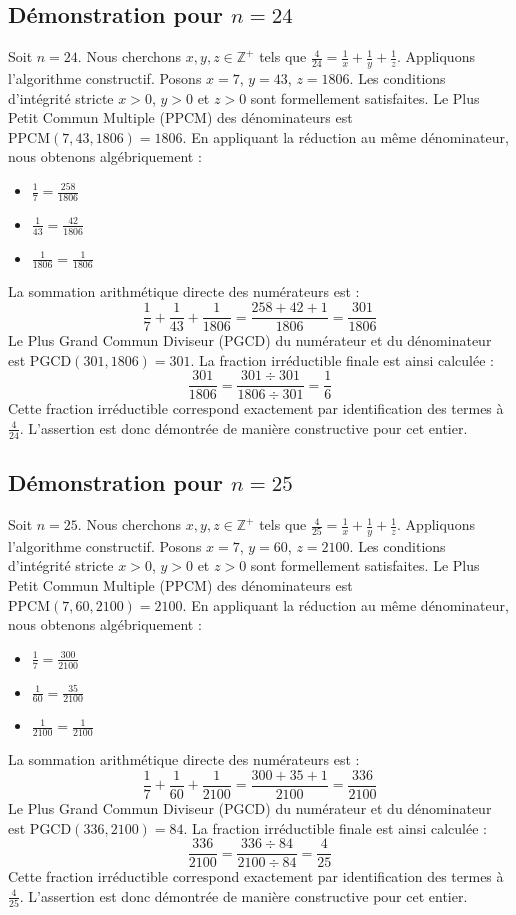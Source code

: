 \documentclass[11pt,a4paper]{article}
\begin{document}
\subsection{Démonstration pour $n = 24$}
Soit $n = 24$. Nous cherchons $x, y, z \in \mathbb{Z}^{+}$ tels que $\frac{4}{24} = \frac{1}{x} + \frac{1}{y} + \frac{1}{z}$.
Appliquons l'algorithme constructif. Posons $x = 7$, $y = 43$, $z = 1806$.
Les conditions d'intégrité stricte $x > 0$, $y > 0$ et $z > 0$ sont formellement satisfaites.
Le Plus Petit Commun Multiple (PPCM) des dénominateurs est $\text{PPCM}(7, 43, 1806) = 1806$.
En appliquant la réduction au même dénominateur, nous obtenons algébriquement :
\begin{itemize}
    \item $\frac{1}{7} = \frac{258}{1806}$
    \item $\frac{1}{43} = \frac{42}{1806}$
    \item $\frac{1}{1806} = \frac{1}{1806}$
\end{itemize}
La sommation arithmétique directe des numérateurs est :
$$ \frac{1}{7} + \frac{1}{43} + \frac{1}{1806} = \frac{258 + 42 + 1}{1806} = \frac{301}{1806} $$
Le Plus Grand Commun Diviseur (PGCD) du numérateur et du dénominateur est $\text{PGCD}(301, 1806) = 301$.
La fraction irréductible finale est ainsi calculée :
$$ \frac{301}{1806} = \frac{301 \div 301}{1806 \div 301} = \frac{1}{6} $$
Cette fraction irréductible correspond exactement par identification des termes à $\frac{4}{24}$. L'assertion est donc démontrée de manière constructive pour cet entier.

\subsection{Démonstration pour $n = 25$}
Soit $n = 25$. Nous cherchons $x, y, z \in \mathbb{Z}^{+}$ tels que $\frac{4}{25} = \frac{1}{x} + \frac{1}{y} + \frac{1}{z}$.
Appliquons l'algorithme constructif. Posons $x = 7$, $y = 60$, $z = 2100$.
Les conditions d'intégrité stricte $x > 0$, $y > 0$ et $z > 0$ sont formellement satisfaites.
Le Plus Petit Commun Multiple (PPCM) des dénominateurs est $\text{PPCM}(7, 60, 2100) = 2100$.
En appliquant la réduction au même dénominateur, nous obtenons algébriquement :
\begin{itemize}
    \item $\frac{1}{7} = \frac{300}{2100}$
    \item $\frac{1}{60} = \frac{35}{2100}$
    \item $\frac{1}{2100} = \frac{1}{2100}$
\end{itemize}
La sommation arithmétique directe des numérateurs est :
$$ \frac{1}{7} + \frac{1}{60} + \frac{1}{2100} = \frac{300 + 35 + 1}{2100} = \frac{336}{2100} $$
Le Plus Grand Commun Diviseur (PGCD) du numérateur et du dénominateur est $\text{PGCD}(336, 2100) = 84$.
La fraction irréductible finale est ainsi calculée :
$$ \frac{336}{2100} = \frac{336 \div 84}{2100 \div 84} = \frac{4}{25} $$
Cette fraction irréductible correspond exactement par identification des termes à $\frac{4}{25}$. L'assertion est donc démontrée de manière constructive pour cet entier.
\end{document}
